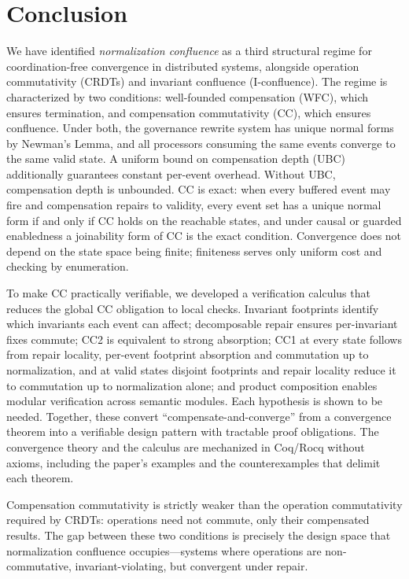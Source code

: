\documentclass[11pt,a4paper]{article}
\theoremstyle{plain}
\theoremstyle{definition}
\theoremstyle{remark}
\begin{document}
\section{Conclusion}
\label{sec:conclusion}

We have identified \emph{normalization confluence} as a third structural regime
for coordination-free convergence in distributed systems, alongside operation
commutativity (CRDTs) and invariant confluence (I-confluence).  The regime is
characterized by two conditions: well-founded compensation (WFC), which
ensures termination, and compensation commutativity (CC), which ensures
confluence.  Under both, the governance rewrite system has unique normal forms
by Newman's Lemma, and all processors consuming the same events converge to
the same valid state.  A uniform bound on compensation depth (UBC) additionally
guarantees constant per-event overhead.  Without UBC, compensation depth is
unbounded.  CC is exact: when every buffered event may fire and compensation
repairs to validity, every event set has a unique normal form if and only if
CC holds on the reachable states, and under causal or guarded enabledness a
joinability form of CC is the exact condition.  Convergence does not depend on
the state space being finite; finiteness serves only uniform cost and
checking by enumeration.

To make CC practically verifiable, we developed a verification calculus that
reduces the global CC obligation to local checks.  Invariant footprints
identify which invariants each event can affect; decomposable repair ensures
per-invariant fixes commute; CC2 is equivalent to strong absorption; CC1 at
every state follows from repair locality, per-event footprint absorption and
commutation up to normalization, and at valid states disjoint footprints and
repair locality reduce it to commutation up to normalization alone; and
product composition enables modular verification across semantic modules.
Each hypothesis is shown to be needed.  Together, these convert
``compensate-and-converge'' from a convergence theorem into a verifiable
design pattern with tractable proof obligations.  The convergence theory and
the calculus are mechanized in Coq/Rocq without axioms, including the paper's examples and the
counterexamples that delimit each theorem.

Compensation commutativity is strictly weaker than the operation commutativity
required by CRDTs: operations need not commute, only their compensated results.
The gap between these two conditions is precisely the design space that
normalization confluence occupies---systems where operations are
non-commutative, invariant-violating, but convergent under repair.
\end{document}
